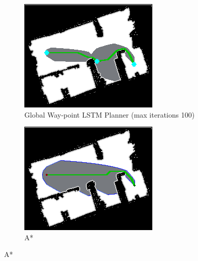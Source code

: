 \begin{figure}[]
  \newline
  \begin{subfigure}[b]{0.38\linewidth}
    \includegraphics[width=\linewidth]{images/screenshot_142.png}
     \caption{Global Way-point LSTM Planner (max iterations 100)}
  \end{subfigure}
  \hfill
  \begin{subfigure}[b]{0.38\linewidth}
    \includegraphics[width=\linewidth]{images/screenshot_117.png}
     \caption{A*\newline}
  \end{subfigure}
  \newline

\end{figure}
